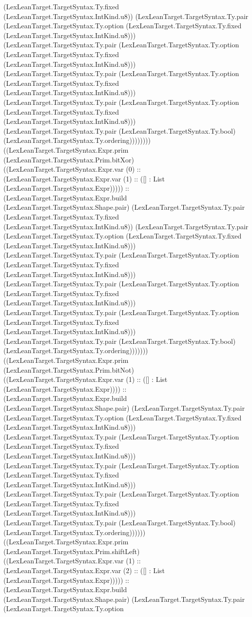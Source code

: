 \documentclass[11pt]{article}
\begin{document}
(LexLeanTarget.TargetSyntax.Ty.fixed (LexLeanTarget.TargetSyntax.IntKind.u8)) (LexLeanTarget.TargetSyntax.Ty.pair (LexLeanTarget.TargetSyntax.Ty.option (LexLeanTarget.TargetSyntax.Ty.fixed (LexLeanTarget.TargetSyntax.IntKind.u8))) (LexLeanTarget.TargetSyntax.Ty.pair (LexLeanTarget.TargetSyntax.Ty.option (LexLeanTarget.TargetSyntax.Ty.fixed (LexLeanTarget.TargetSyntax.IntKind.u8))) (LexLeanTarget.TargetSyntax.Ty.pair (LexLeanTarget.TargetSyntax.Ty.option (LexLeanTarget.TargetSyntax.Ty.fixed (LexLeanTarget.TargetSyntax.IntKind.u8))) (LexLeanTarget.TargetSyntax.Ty.pair (LexLeanTarget.TargetSyntax.Ty.option (LexLeanTarget.TargetSyntax.Ty.fixed (LexLeanTarget.TargetSyntax.IntKind.u8))) (LexLeanTarget.TargetSyntax.Ty.pair (LexLeanTarget.TargetSyntax.Ty.bool) (LexLeanTarget.TargetSyntax.Ty.ordering)))))))) ((LexLeanTarget.TargetSyntax.Expr.prim (LexLeanTarget.TargetSyntax.Prim.bitXor) ((LexLeanTarget.TargetSyntax.Expr.var (0) :: (LexLeanTarget.TargetSyntax.Expr.var (1) :: ([] : List (LexLeanTarget.TargetSyntax.Expr))))) :: (LexLeanTarget.TargetSyntax.Expr.build (LexLeanTarget.TargetSyntax.Shape.pair) (LexLeanTarget.TargetSyntax.Ty.pair (LexLeanTarget.TargetSyntax.Ty.fixed (LexLeanTarget.TargetSyntax.IntKind.u8)) (LexLeanTarget.TargetSyntax.Ty.pair (LexLeanTarget.TargetSyntax.Ty.option (LexLeanTarget.TargetSyntax.Ty.fixed (LexLeanTarget.TargetSyntax.IntKind.u8))) (LexLeanTarget.TargetSyntax.Ty.pair (LexLeanTarget.TargetSyntax.Ty.option (LexLeanTarget.TargetSyntax.Ty.fixed (LexLeanTarget.TargetSyntax.IntKind.u8))) (LexLeanTarget.TargetSyntax.Ty.pair (LexLeanTarget.TargetSyntax.Ty.option (LexLeanTarget.TargetSyntax.Ty.fixed (LexLeanTarget.TargetSyntax.IntKind.u8))) (LexLeanTarget.TargetSyntax.Ty.pair (LexLeanTarget.TargetSyntax.Ty.option (LexLeanTarget.TargetSyntax.Ty.fixed (LexLeanTarget.TargetSyntax.IntKind.u8))) (LexLeanTarget.TargetSyntax.Ty.pair (LexLeanTarget.TargetSyntax.Ty.bool) (LexLeanTarget.TargetSyntax.Ty.ordering))))))) ((LexLeanTarget.TargetSyntax.Expr.prim (LexLeanTarget.TargetSyntax.Prim.bitNot) ((LexLeanTarget.TargetSyntax.Expr.var (1) :: ([] : List (LexLeanTarget.TargetSyntax.Expr)))) :: (LexLeanTarget.TargetSyntax.Expr.build (LexLeanTarget.TargetSyntax.Shape.pair) (LexLeanTarget.TargetSyntax.Ty.pair (LexLeanTarget.TargetSyntax.Ty.option (LexLeanTarget.TargetSyntax.Ty.fixed (LexLeanTarget.TargetSyntax.IntKind.u8))) (LexLeanTarget.TargetSyntax.Ty.pair (LexLeanTarget.TargetSyntax.Ty.option (LexLeanTarget.TargetSyntax.Ty.fixed (LexLeanTarget.TargetSyntax.IntKind.u8))) (LexLeanTarget.TargetSyntax.Ty.pair (LexLeanTarget.TargetSyntax.Ty.option (LexLeanTarget.TargetSyntax.Ty.fixed (LexLeanTarget.TargetSyntax.IntKind.u8))) (LexLeanTarget.TargetSyntax.Ty.pair (LexLeanTarget.TargetSyntax.Ty.option (LexLeanTarget.TargetSyntax.Ty.fixed (LexLeanTarget.TargetSyntax.IntKind.u8))) (LexLeanTarget.TargetSyntax.Ty.pair (LexLeanTarget.TargetSyntax.Ty.bool) (LexLeanTarget.TargetSyntax.Ty.ordering)))))) ((LexLeanTarget.TargetSyntax.Expr.prim (LexLeanTarget.TargetSyntax.Prim.shiftLeft) ((LexLeanTarget.TargetSyntax.Expr.var (1) :: (LexLeanTarget.TargetSyntax.Expr.var (2) :: ([] : List (LexLeanTarget.TargetSyntax.Expr))))) :: (LexLeanTarget.TargetSyntax.Expr.build (LexLeanTarget.TargetSyntax.Shape.pair) (LexLeanTarget.TargetSyntax.Ty.pair (LexLeanTarget.TargetSyntax.Ty.option 
\end{document}
